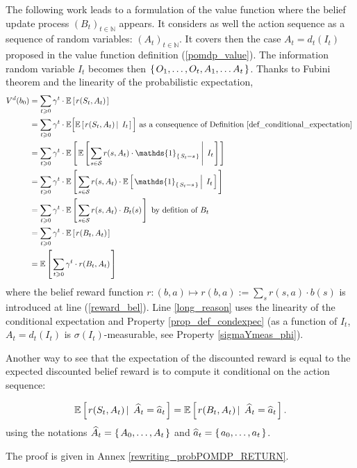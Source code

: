The following work leads to a formulation of the value function
where the belief update process $(B_t)_{t \in \mathbb{N}}$ appears.
It considers as well the action sequence 
as a sequence of random variables: $(A_t)_{t \in \mathbb{N}}$.
It covers then the case $A_t=d_t(I_t)$ proposed in the 
value function definition (\ref{pomdp_value}).
The information random variable $I_t$
becomes then 
$\left\{ \left.  O_1, \ldots, O_t, A_1, \ldots A_t  \right. \right\}$.
Thanks to Fubini theorem and the linearity of the probabilistic expectation,
\begin{align}
\nonumber V^d(b_0)  	& = \sum_{ t \geqslant 0} \gamma^t \cdot \mathbb{E} \croch{ r(S_t,A_t) }  \\
\nonumber			& = \sum_{ t \geqslant 0} \gamma^t \cdot \mathbb{E} \Big[ \mathbb{E} \croch{r(S_t,A_t) \sachant I_t } \Big]
\mbox{ as a consequence of Definition \ref{def_conditional_expectation} }  \\
\nonumber	& = \sum_{ t \geqslant 0} \gamma^t \cdot \mathbb{E} \croch{ \mathbb{E} \croch{ \sum_{s \in \mathcal{S}} r(s,A_t) \cdot \mathds{1}_{\set{S_t = s}} \sachant I_t } } \\
\label{long_reason}	& = \sum_{ t \geqslant 0} \gamma^t \cdot \mathbb{E} \croch{  \sum_{s \in \mathcal{S}} r(s,A_t) \cdot \mathbb{E} \croch{ \mathds{1}_{\set{S_t = s}} \sachant I_t } } \\
\nonumber	& = \sum_{ t \geqslant 0} \gamma^t \cdot \mathbb{E} \croch{ \sum_{s \in \mathcal{S}} r(s,A_t) \cdot B_t(s) }
\mbox{ by defition of } B_t \\
\label{reward_bel}	& = \sum_{ t \geqslant 0} \gamma^t \cdot \mathbb{E} \croch{ r(B_t,A_t) } \\ 
\nonumber		& = \mathbb{E} \croch{ \sum_{ t \geqslant 0} \gamma^t \cdot  r(B_t,A_t) }
\end{align}
where the belief reward function $r: (b,a) \mapsto r(b,a):= \sum_s r(s,a) \cdot b(s)$ 
is introduced at line (\ref{reward_bel}).
Line \ref{long_reason} uses the linearity of the conditional expectation 
and Property \ref{prop_def_condexpec} (as a function of $I_t$, $A_t = d_t(I_t)$ is $\sigma(I_t)$-measurable, see Property \ref{sigmaYmeas_phi}).

Another way to see that the expectation of the discounted reward is equal to the expected discounted belief reward 
is to compute it conditional on the action sequence:
\begin{theorem}
\label{rewriting_probPOMDP}
\begin{equation}
\mathbb{E} \left[ \left.  r(S_t,A_t) \, \right| \left. \, \widehat{A}_{t} = \widehat{a}_{t}  \right. \right] = \mathbb{E} \left[ \left.  r(B_t,A_t) \, \right| \left. \, \widehat{A}_{t} = \widehat{a}_{t}  \right. \right].
\label{reward_cond}
\end{equation}
using the notations 
$\widehat{A}_{t} = \left\{ \left.  A_0, \ldots, A_{t}  \right. \right\}$
and
$\widehat{a}_{t} = \left\{ \left.  a_0, \ldots, a_{t}  \right. \right\}$.
\end{theorem}
The proof is given in Annex \ref{rewriting_probPOMDP_RETURN}.

